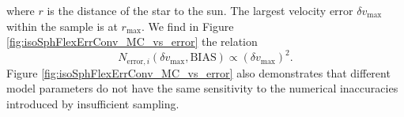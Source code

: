 where $r$ is the distance of the star to the sun. The largest velocity error $\delta v_\text{max}$ within the sample is at $r_\text{max}$. We find in Figure \ref{fig:isoSphFlexErrConv_MC_vs_error} the relation
\begin{equation*}
N_{\text{error},i} (\delta v_\text{max},\text{BIAS}) \propto \left( \delta v_\text{max} \right)^2.
\end{equation*}
Figure \ref{fig:isoSphFlexErrConv_MC_vs_error} also demonstrates that different model parameters do not have the same sensitivity to the numerical inaccuracies introduced by insufficient sampling. 

